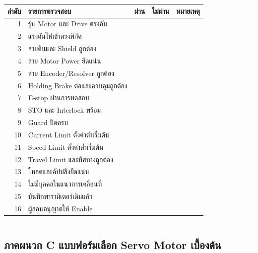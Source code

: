 \begin{table}[htbp]
    \centering
    \begin{tabular}{r l c c l}
        \hline
        \textbf{ลำดับ} & \textbf{รายการตรวจสอบ} & \textbf{ผ่าน} & \textbf{ไม่ผ่าน} & \textbf{หมายเหตุ} \\
        \hline
        1 & รุ่น Motor และ Drive ตรงกัน &  &  &  \\
        2 & แรงดันไฟเข้าตรงพิกัด &  &  &  \\
        3 & สายดินและ Shield ถูกต้อง &  &  &  \\
        4 & สาย Motor Power ยึดแน่น &  &  &  \\
        5 & สาย Encoder/Resolver ถูกต้อง &  &  &  \\
        6 & Holding Brake ต่อและควบคุมถูกต้อง &  &  &  \\
        7 & E-stop ผ่านการทดสอบ &  &  &  \\
        8 & STO และ Interlock พร้อม &  &  &  \\
        9 & Guard ปิดครบ &  &  &  \\
        10 & Current Limit ตั้งค่าต่ำเริ่มต้น &  &  &  \\
        11 & Speed Limit ตั้งค่าต่ำเริ่มต้น &  &  &  \\
        12 & Travel Limit และทิศทางถูกต้อง &  &  &  \\
        13 & โหลดและคัปปลิงยึดแน่น &  &  &  \\
        14 & ไม่มีบุคคลในแนวการเคลื่อนที่ &  &  &  \\
        15 & บันทึกพารามิเตอร์เดิมแล้ว &  &  &  \\
        16 & ผู้สอนอนุญาตให้ Enable &  &  &  \\
        \hline
    \end{tabular}
\end{table}

\par\noindent\rule{\textwidth}{0.4pt}\par

\subsection{ภาคผนวก C แบบฟอร์มเลือก Servo Motor เบื้องต้น}


